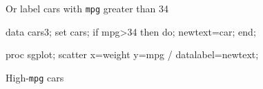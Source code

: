\documentclass[unknownkeysallowed]{beamer}\usepackage[]{graphicx}\usepackage[]{color}
\begin{document}
\begin{frame}[fragile]{Or label cars with \texttt{mpg} greater than
    34}

  \begin{Datastep}
data cars3;
  set cars;
  if mpg>34 then do;
     newtext=car;
  end;
    
  \end{Datastep}
  \begin{Sascode}[store=mjk]
proc sgplot;
  scatter x=weight y=mpg / datalabel=newtext;
  \end{Sascode}

  
\end{frame}

\begin{frame}{High-\texttt{mpg} cars}

  
\end{frame}




\end{document}
